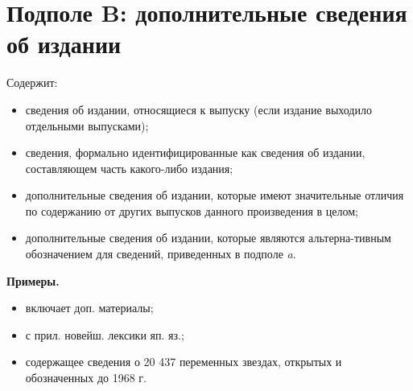 \section{Подполе B: дополнительные сведения об издании}

Содержит:

\begin{itemize}
    \item сведения об издании, относящиеся к выпуску (если издание выходило отдельными выпусками);
    \item сведения, формально идентифицированные как сведения об издании, составляющем часть какого-либо издания;
    \item дополнительные сведения об издании, которые имеют значительные отличия по содержанию от других выпусков данного произведения в целом;
    \item дополнительные сведения об издании, которые являются альтерна-тивным обозначением для сведений, приведенных в подполе \emph{a}.
\end{itemize}

\textbf{Примеры.}

\begin{itemize}
    \item включает доп. материалы;
    \item с прил. новейш. лексики яп. яз.;
    \item содержащее сведения о 20 437 переменных звездах, открытых и обозначенных до 1968 г.
\end{itemize}


